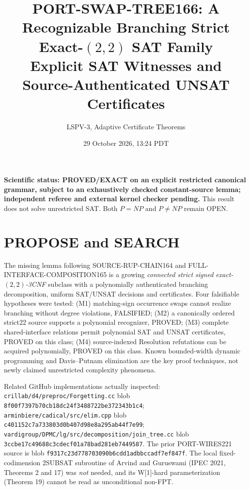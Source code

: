 \documentclass[11pt]{article}
\title{PORT-SWAP-TREE166: A Recognizable Branching Strict Exact-$(2,2)$ SAT Family\\
\large Explicit SAT Witnesses and Source-Authenticated UNSAT Certificates}
\author{LSPV-3, Adaptive Certificate Theorems}
\date{29 October 2026, 13:24 PDT}
\begin{document}
\maketitle
\noindent\textbf{Scientific status: PROVED/EXACT on an explicit restricted canonical grammar, subject to an exhaustively checked constant-source lemma; independent referee and external kernel checker pending.}
This result does not solve unrestricted SAT. Both $P=NP$ and $P\ne NP$ remain OPEN.

\section{PROPOSE and SEARCH}
The missing lemma following SOURCE-RUP-CHAIN164 and FULL-INTERFACE-COMPOSITION165 is a growing \emph{connected strict signed exact-$(2,2)$-3CNF} subclass with a polynomially authenticated branching decomposition, uniform SAT/UNSAT decisions and certificates. Four falsifiable hypotheses were tested: (M1) matching-sign occurrence swaps cannot realize branching without degree violations, FALSIFIED; (M2) a canonically ordered strict22 source supports a polynomial recognizer, PROVED; (M3) complete shared-interface relations permit polynomial SAT and UNSAT certificates, PROVED on this class; (M4) source-indexed Resolution refutations can be acquired polynomially, PROVED on this class. Known bounded-width dynamic programming and Davis--Putnam elimination are the key proof techniques, not newly claimed unrestricted complexity phenomena.

Related GitHub implementations actually inspected: \texttt{crillab/d4/preproc/Forgetting.cc} blob \texttt{8f00f7397b70cb18dc24f3488722be372343b1c4}; \texttt{arminbiere/cadical/src/elim.cpp} blob \texttt{c401152c7a733803d0b407d98e8a295ab44f7e99}; \texttt{vardigroup/DPMC/lg/src/decomposition/join\_tree.cc} blob \texttt{3ccbe17c49688c3cdecf01a78bad281eb7449587}. The prior PORT-WIRES221 source is blob \texttt{f9317c23d778703090b6cdd1adbbccadf7ef847f}. The local fixed-codimension 2SUBSAT subroutine of Arvind and Guruswami (IPEC 2021, Theorems 2 and 17) was \emph{not} needed, and its W[1]-hard parameterization (Theorem 19) cannot be read as unconditional non-FPT.
\end{document}
